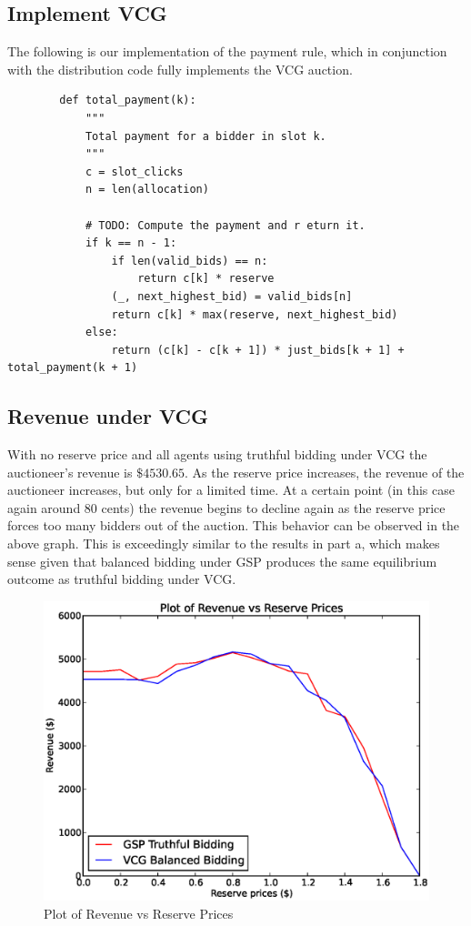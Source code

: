 \documentclass[11pt]{article}
\begin{document}
\subsection{Implement VCG}
The following is our implementation of the payment rule, which in conjunction with the distribution code fully implements the VCG auction.
\begin{verbatim}
        def total_payment(k):
            """
            Total payment for a bidder in slot k.
            """
            c = slot_clicks
            n = len(allocation)

            # TODO: Compute the payment and r eturn it.
            if k == n - 1:
                if len(valid_bids) == n:
                    return c[k] * reserve
                (_, next_highest_bid) = valid_bids[n]
                return c[k] * max(reserve, next_highest_bid)
            else:
                return (c[k] - c[k + 1]) * just_bids[k + 1] + total_payment(k + 1)
\end{verbatim}
\subsection{Revenue under VCG}
With no reserve price and all agents using truthful bidding under VCG the auctioneer's revenue is $\$4530.65$. As the reserve price increases, the revenue of the auctioneer increases, but only for a limited time. At a certain point (in this case again around $80$ cents) the revenue begins to decline again as the reserve price forces too many bidders out of the auction. This behavior can be observed in the above graph. This is exceedingly similar to the results in part a, which makes sense given that balanced bidding under GSP produces the same equilibrium outcome as truthful bidding under VCG.
\begin{figure}[h]
\includegraphics[width=\textwidth]{revenue_plot.eps}
\caption{Plot of Revenue vs Reserve Prices}
\end{figure}
\end{document}
